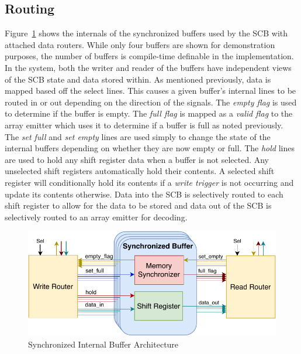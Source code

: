     \subsection{Routing}
        Figure~\ref{fig:sb_arch} shows the internals of the synchronized buffers used by the SCB with attached data routers. While only four buffers are shown for demonstration purposes, the number of buffers is compile-time definable in the implementation. In the system, both the writer and reader of the buffers have independent views of the SCB state and data stored within. As mentioned previously, data is mapped based off the select lines. This causes a given buffer's internal lines to be routed in or out depending on the direction of the signals. The {\it empty flag} is used to determine if the buffer is empty. The {\it full flag} is mapped as a {\it valid flag} to the array emitter which uses it to determine if a buffer is full as noted previously. The {\it set full} and {\it set empty} lines are used simply to change the state of the internal buffers depending on whether they are now empty or full. The {\it hold} lines are used to hold any shift register data when a buffer is not selected. Any unselected shift registers automatically hold their contents. A selected shift register will conditionally hold its contents if a {\it write trigger} is not occurring and update its contents otherwise. Data into the SCB is selectively routed to each shift register to allow for the data to be stored and data out of the SCB is selectively routed to an array emitter for decoding.

        \begin{figure}
            \centering
            \includegraphics[width=1.0\textwidth]{fig/pdp_sb_arch.pdf}
            \caption{Synchronized Internal Buffer Architecture}
            \label{fig:sb_arch}
        \end{figure}

